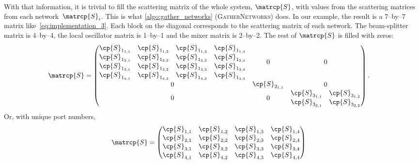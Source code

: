 \begin{refsection}
With that information, it is trivial to fill the scattering matrix of the whole system, $\matrcp{S}$, with values from the scattering matrices from each network~$\matrcp{S}_i$.
This is what \cref{algo:gather_networks} (\textsc{GatherNetworks}) does.
In our example, the result is a 7--by--7 matrix like~\cref{eq:implementation_3}.
Each block on the diagonal corresponds to the scattering matrix of each network.
The beam-splitter matrix is 4--by--4, the local oscillator matrix is 1--by--1 and the mixer matrix is 2--by--2.
The rest of $\matrcp{S}$ is filled with zeros:
\begin{align}
    \matrcp{S}
    &=
    \begin{pmatrix}
        \begin{matrix}
            \cp{S}_{1_{1,1}} & \cp{S}_{1_{1,2}} & \cp{S}_{1_{1,3}} & \cp{S}_{1_{1,4}} \\
            \cp{S}_{1_{2,1}} & \cp{S}_{1_{2,2}} & \cp{S}_{1_{2,3}} & \cp{S}_{1_{2,4}} \\
            \cp{S}_{1_{3,1}} & \cp{S}_{1_{3,2}} & \cp{S}_{1_{3,3}} & \cp{S}_{1_{3,4}} \\
            \cp{S}_{1_{4,1}} & \cp{S}_{1_{4,2}} & \cp{S}_{1_{4,3}} & \cp{S}_{1_{4,4}}
        \end{matrix}
        & 0 & 0
        \\
        0 &
        \begin{matrix}
            \cp{S}_{2_{1,1}}
        \end{matrix}
        & 0
        \\
        0&0&
        \begin{matrix}
            \cp{S}_{3_{1,1}} & \cp{S}_{3_{1,2}}\\
            \cp{S}_{3_{2,1}} & \cp{S}_{3_{2,2}}
        \end{matrix}
    \end{pmatrix}\text{.}
\end{align}
Or, with unique port numbers,
\begin{align}
    \matrcp{S}
    &=
    \begin{pmatrix}
        \begin{matrix}
            \cp{S}_{1,1} & \cp{S}_{1,2} & \cp{S}_{1,3} & \cp{S}_{1,4} \\
            \cp{S}_{2,1} & \cp{S}_{2,2} & \cp{S}_{2,3} & \cp{S}_{2,4} \\
            \cp{S}_{3,1} & \cp{S}_{3,2} & \cp{S}_{3,3} & \cp{S}_{3,4} \\
            \cp{S}_{4,1} & \cp{S}_{4,2} & \cp{S}_{4,3} & \cp{S}_{4,4}

\end{matrix}
\end{pmatrix}
\end{align}
\end{refsection}
